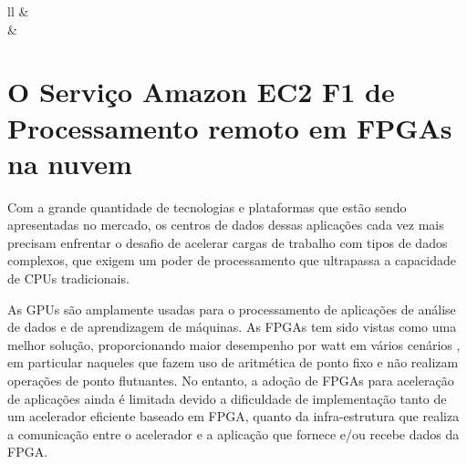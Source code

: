 \begin{itemize}
\begin{table}[H]
\begin{tabular}{ll}
        &                                                              \\ \hline
     &                                                                                                \\ \hline
    \end{tabular}
   
\end{table}



\end{itemize}

\section{O Serviço Amazon EC2 F1  de Processamento remoto  em   FPGAs na nuvem}\label{sec:servicos amazon}

    Com a grande quantidade de tecnologias e plataformas que estão sendo apresentadas no mercado, os centros de dados dessas aplicações cada vez mais precisam enfrentar o desafio de acelerar cargas de trabalho com tipos de dados complexos, que exigem um poder de processamento que ultrapassa a capacidade de CPUs tradicionais.
    
    As GPUs são amplamente usadas para o processamento de aplicações de análise de dados e de aprendizagem de máquinas. As FPGAs tem sido vistas como uma melhor solução, proporcionando maior desempenho por watt em vários cenários \cite{8119247}, em particular naqueles que fazem uso de aritmética de ponto fixo e não realizam operações de ponto flutuantes. No entanto, a adoção de FPGAs para aceleração de aplicações ainda é limitada devido a dificuldade de implementação tanto de um acelerador eficiente baseado em FPGA,  quanto da infra-estrutura que realiza a comunicação entre o acelerador e a aplicação que fornece e/ou recebe dados da FPGA. 
    
